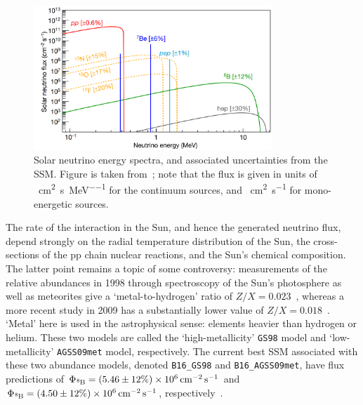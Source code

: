\begin{figure}
    \centering
    \includegraphics[width=0.8\textwidth]{1_NeutrinoTheory/Figs/solar_nu_energy_spec_SSM.png}
    \caption[Solar neutrino energy spectrum, and associated uncertainties from the SMM]
    {Solar neutrino energy spectra, and associated uncertainties from the SSM. Figure is taken from~\cite{agostiniComprehensiveMeasurementPpchain2018,vinyolesB16StandardSolar2018}; note that the flux is given in units of \si{\per\cm\squared\per\second\per\MeV} for the continuum sources, and \si{\per\cm\squared\per\second} for mono-energetic sources.}
    \label{fig:ssm_neutrino_spectra}
\end{figure}

The rate of the \beight{} interaction in the Sun, and hence the generated neutrino flux, depend strongly on the radial temperature distribution of the Sun, the cross-sections of the pp chain nuclear reactions, and the Sun's chemical composition. The latter point remains a topic of some controversy: measurements of the relative abundances in 1998 through spectroscopy of the Sun's photosphere as well as meteorites give a `metal-to-hydrogen' ratio of $Z/X = 0.023$~\cite{grevesseStandardSolarComposition1998}, whereas a more recent study in 2009 has a substantially lower value of $Z/X = 0.018$~\cite{asplundChemicalCompositionSun2009}. `Metal' here is used in the astrophysical sense: elements heavier than hydrogen or helium. These two models are called the `high-metallicity' \texttt{GS98} model and `low-metallicity' \texttt{AGSS09met} model, respectively. The current best SSM associated with these two abundance models, denoted \texttt{B16\_GS98} and \texttt{B16\_AGSS09met}, have \beight{} flux predictions of $\Phi_{\beight{}} = (5.46\pm12\%)\times 10^{6}\,\si{\per\cm\squared\per\second}$ and $\Phi_{\beight{}} = (4.50\pm12\%)\times 10^{6}\,\si{\per\cm\squared\per\second}$, respectively~\cite{vinyolesB16StandardSolar2018}.

